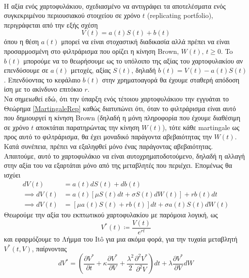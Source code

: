 \documentclass[12pt,a4paper,twoside,openany]{book}
\begin{document}
    \vspace{2.5mm}\\
    Η αξία ενός χαρτοφυλάκιου, σχεδιασμένο να αντιγράφει τα αποτελέσματα ενός συγκεκριμένου περιουσιακού στοιχείου σε χρόνο $t$ (replicating portfolio), περιγράφεται από την εξής σχέση 
    \[V(t)= a(t)S(t)+ b(t)\]
    όπου η θέση $a(t)$ μπορεί να είναι στοχαστική διαδικασία αλλά πρέπει να είναι προσαρμοσμένη στο φιλτράρισμα που ορίζει η κίνηση Brown, $W(t),\, t\geq0$. To $b(t)$ μπορούμε να το θεωρήσουμε ως το υπόλοιπο της αξίας του χαρτοφυλακίου αν επενδύσουμε σε $a(t)$ μετοχές, αξίας $S(t)$, δηλαδή $b(t)= V(t) - a(t)S(t)$. Επενδύοντας το κεφάλαιο $b(t)$ στην χρηματοαγορά θα έχουμε σταθερή απόδοση ίση με το ακίνδυνο επιτόκιο $r$.
    \vspace{2.5mm}\\
    Να σημειωθεί εδώ, ότι την ύπαρξη ενός τέτοιου χαρτοφυλάκιου την εγγυάται το Θεώρημα \ref{MartingaleRep} καθώς διατυπώνει ότι, όταν το φιλτράρισμα είναι αυτό που δημιουργεί η κίνηση Brown (δηλαδή η μόνη πληροφορία που έχουμε διαθέσιμη σε χρόνο $t$ αποκτάται παρατηρώντας την κίνηση $W(t)$), τότε κάθε martingale ως προς αυτό το φιλτράρισμα, θα έχει μοναδικό παράγοντα αβεβαιότητας την $W(t)$. Κατά συνέπεια, πρέπει να εξαληφθεί μόνο ένας παράγοντας αβεβαιότητας.
    \vspace{2.5mm}\\
    Απαιτούμε, αυτό το χαρτοφυλάκιο να είναι αυτοχρηματοδοτούμενο, δηλαδή η αλλαγή στην αξία του να εξαρτάται μόνο από της μεταβλητές που περιέχει. Επομένως θα ισχύει
    \begin{align*}
    	dV(t) &= a(t)dS(t) + db(t) \\
    	\implies dV(t) &= a(t)\left[\mu S(t)dt+ \sigma S(t)dW(t)\right] +rb(t)dt \\
    	\implies dV(t) &= \left[\mu a(t)S(t) +rb(t)\right]dt + \sigma a(t)S(t)dW(t)
    \end{align*}
 	Θεωρούμε την αξία του εκπτωτικού χαρτοφυλακίου με παρόμοια λογική, ως 
 	\[V^*(t)\coloneqq \frac{V(t)}{e^{rt}}\]
 	και εφαρμόζουμε το Λήμμα του Itô για μια ακόμα φορά, για την τυχαία μεταβλητή $V^*(t,V)$, παίρνοντας
 	\[dV^*= \left(\frac{\partial V^*}{\partial t} +\kappa\frac{\partial V^*}{\partial V} + \frac{\lambda^2}{2}\frac{\partial^2 V^*}{\partial^2 V} \right)dt + \lambda\frac{\partial V^*}{\partial V}dW \]
\end{document}
